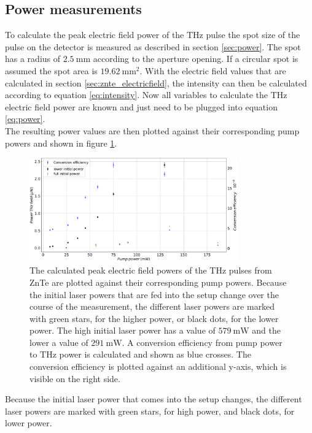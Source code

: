 \subsection{Power measurements}
\FloatBarrier
To calculate the peak electric field power of the $\si{\tera\hertz}$ pulse the spot size of the pulse on the detector is measured as described in section \ref{sec:power}.
The spot has a radius of $\SI{2.5}{\milli\meter}$ according to the aperture opening.
If a circular spot is assumed the spot area is $\SI{19.62}{\milli\meter\squared}$.
With the electric field values that are calculated in section \ref{sec:znte_electricfield}, the intensity can then be calculated according to equation \eqref{eq:intensity}.
Now all variables to calculate the $\si{\tera\hertz}$ electric field power are known and just need to be plugged into equation \eqref{eq:power}.
\\
The resulting power values are then plotted against their corresponding pump powers and shown in figure \ref{fig:znte_power}.
\begin{figure}
    \centering
    \includegraphics[width=0.8\textwidth]{Plots/Powerznte.pdf}
    \caption{The calculated peak electric field powers of the $\si{\tera\hertz}$ pulses from ZnTe are plotted against their corresponding pump powers.
    Because the initial laser powers that are fed into the setup change over the course of the measurement, the different laser powers are marked with green stars, for the higher power, or black dots, for the lower power.
    The high initial laser power has a value of $\SI{579}{\milli\W}$ and the lower a value of $\SI{291}{\milli\W}$.
    A conversion efficiency from pump power to $\si{\tera\hertz}$ power is calculated and shown as blue crosses. 
    The conversion efficiency is plotted against an additional y-axis, which is visible on the right side.}
    \label{fig:znte_power}
\end{figure}
Because the initial laser power that comes into the setup changes, the different laser powers are marked with green stars, for high power, and black dots, for lower power.
